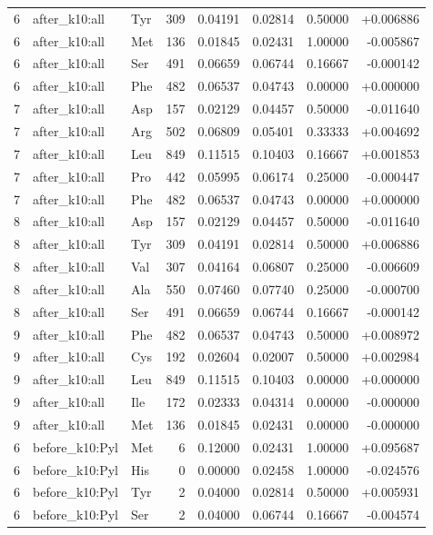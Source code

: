 \begin{longtable}{r l l r r r r r}
6 & after\_k10:all & Tyr & 309 & 0.04191 & 0.02814 & 0.50000 & +0.006886 \\
6 & after\_k10:all & Met & 136 & 0.01845 & 0.02431 & 1.00000 & -0.005867 \\
6 & after\_k10:all & Ser & 491 & 0.06659 & 0.06744 & 0.16667 & -0.000142 \\
6 & after\_k10:all & Phe & 482 & 0.06537 & 0.04743 & 0.00000 & +0.000000 \\
7 & after\_k10:all & Asp & 157 & 0.02129 & 0.04457 & 0.50000 & -0.011640 \\
7 & after\_k10:all & Arg & 502 & 0.06809 & 0.05401 & 0.33333 & +0.004692 \\
7 & after\_k10:all & Leu & 849 & 0.11515 & 0.10403 & 0.16667 & +0.001853 \\
7 & after\_k10:all & Pro & 442 & 0.05995 & 0.06174 & 0.25000 & -0.000447 \\
7 & after\_k10:all & Phe & 482 & 0.06537 & 0.04743 & 0.00000 & +0.000000 \\
8 & after\_k10:all & Asp & 157 & 0.02129 & 0.04457 & 0.50000 & -0.011640 \\
8 & after\_k10:all & Tyr & 309 & 0.04191 & 0.02814 & 0.50000 & +0.006886 \\
8 & after\_k10:all & Val & 307 & 0.04164 & 0.06807 & 0.25000 & -0.006609 \\
8 & after\_k10:all & Ala & 550 & 0.07460 & 0.07740 & 0.25000 & -0.000700 \\
8 & after\_k10:all & Ser & 491 & 0.06659 & 0.06744 & 0.16667 & -0.000142 \\
9 & after\_k10:all & Phe & 482 & 0.06537 & 0.04743 & 0.50000 & +0.008972 \\
9 & after\_k10:all & Cys & 192 & 0.02604 & 0.02007 & 0.50000 & +0.002984 \\
9 & after\_k10:all & Leu & 849 & 0.11515 & 0.10403 & 0.00000 & +0.000000 \\
9 & after\_k10:all & Ile & 172 & 0.02333 & 0.04314 & 0.00000 & -0.000000 \\
9 & after\_k10:all & Met & 136 & 0.01845 & 0.02431 & 0.00000 & -0.000000 \\
6 & before\_k10:Pyl & Met & 6 & 0.12000 & 0.02431 & 1.00000 & +0.095687 \\
6 & before\_k10:Pyl & His & 0 & 0.00000 & 0.02458 & 1.00000 & -0.024576 \\
6 & before\_k10:Pyl & Tyr & 2 & 0.04000 & 0.02814 & 0.50000 & +0.005931 \\
6 & before\_k10:Pyl & Ser & 2 & 0.04000 & 0.06744 & 0.16667 & -0.004574 \\

\end{longtable}
